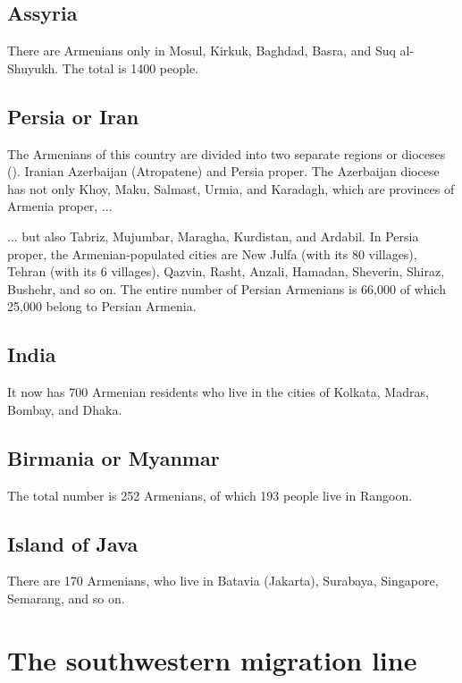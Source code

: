 \subsection{Assyria}

There are Armenians only in Mosul, Kirkuk, Baghdad, Basra, and Suq al-Shuyukh. The total is 1400 people.

\subsection{Persia or Iran}


The Armenians of this country are divided into two separate  regions or  dioceses (). Iranian Azerbaijan (Atropatene) and Persia proper. The Azerbaijan diocese has not only Khoy, Maku, Salmast, Urmia, and Karadagh, which are provinces of Armenia proper, ... 

\begin{adjarianpage}\label{page:28}\end{adjarianpage}%

... but also Tabriz, Mujumbar, Maragha, Kurdistan, and Ardabil. In Persia proper, the Armenian-populated cities are New Julfa (with its 80 villages), Tehran (with its 6 villages), Qazvin, Rasht, Anzali, Hamadan, Sheverin, Shiraz, Bushehr, and so on. The entire number of Persian Armenians is 66,000 of which 25,000 belong to Persian Armenia. 

\subsection{India}

It now has 700 Armenian residents who live in the cities of Kolkata, Madras, Bombay, and Dhaka. 

\subsection{Birmania or Myanmar}

The total number is 252 Armenians, of which 193 people live in Rangoon.

\subsection{Island of Java}

There are 170 Armenians, who live in Batavia (Jakarta), Surabaya, Singapore, Semarang, and so on. 

\section{The southwestern migration line}

